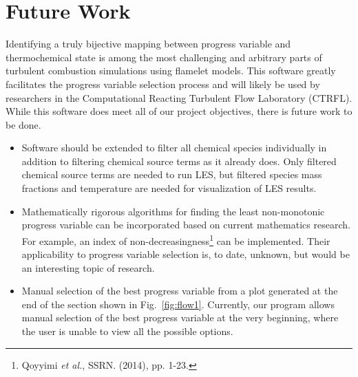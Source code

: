 \documentclass[11pt]{article}
\begin{document}
\section{Future Work}
Identifying a truly bijective mapping between progress variable and thermochemical state is among the most challenging and arbitrary parts of turbulent combustion simulations using flamelet models. This software greatly facilitates the progress variable selection process and will likely be used by researchers in the Computational Reacting Turbulent Flow Laboratory (CTRFL). While this software does meet all of our project objectives, there is future work to be done.

\begin{itemize}
\item Software should be extended to filter all chemical species individually in addition to filtering chemical source terms as it already does. Only filtered chemical source terms are needed to run LES, but filtered species mass fractions and temperature are needed for visualization of LES results.
\item Mathematically rigorous algorithms for finding the least non-monotonic progress variable can be incorporated based on current mathematics research. For example, an index of non-decreasingness\footnote{Qoyyimi \textit{et al.}, SSRN. (2014), pp. 1-23.} can be implemented. Their applicability to progress variable selection is, to date, unknown, but would be an interesting topic of research.
\item Manual selection of the best progress variable from a plot generated at the end of the section shown in Fig.~\ref{fig:flow1}. Currently, our program allows manual selection of the best progress variable at the very beginning, where the user is unable to view all the possible options.
\end{itemize}


\end{document}
